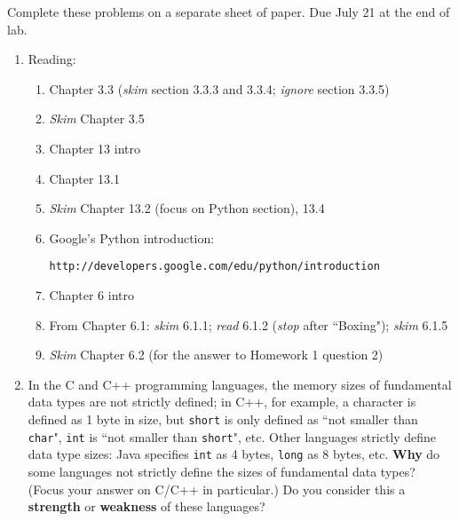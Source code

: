 \documentclass[9pt]{article}
\begin{document}
\noindent Complete these problems on a separate sheet of paper. Due July 21 at
the end of lab.
\begin{enumerate}
   \item Reading:

         \begin{enumerate}
            \item Chapter 3.3 (\textit{skim} section 3.3.3 and 3.3.4;
                  \textit{ignore} section 3.3.5)
            \item \textit{Skim} Chapter 3.5
            \item Chapter 13 intro
            \item Chapter 13.1
            \item \textit{Skim} Chapter 13.2 (focus on Python section), 13.4
            \item Google's Python introduction:

                  \verb|http://developers.google.com/edu/python/introduction|
            \item Chapter 6 intro
            \item From Chapter 6.1: \textit{skim} 6.1.1; \textit{read} 6.1.2
                  (\textit{stop} after ``Boxing"); \textit{skim} 6.1.5
            \item \textit{Skim} Chapter 6.2 (for the answer to Homework 1
                  question 2)
         \end{enumerate}
   \item In the C and C++ programming languages, the memory sizes of fundamental
         data types are not strictly defined; in C++, for example, a character
         is defined as 1 byte in size, but \verb|short| is only defined as ``not
         smaller than \verb|char|", \verb|int| is ``not smaller than
         \verb|short|", etc. Other languages strictly define data type sizes:
         Java specifies \verb|int| as 4 bytes, \verb|long| as 8 bytes, etc.
         \textbf{Why} do some languages not strictly define the sizes of
         fundamental data types? (Focus your answer on C/C++ in particular.) Do
         you consider this a \textbf{strength} or \textbf{weakness} of these
         languages?
         

\end{enumerate}
\end{document}
